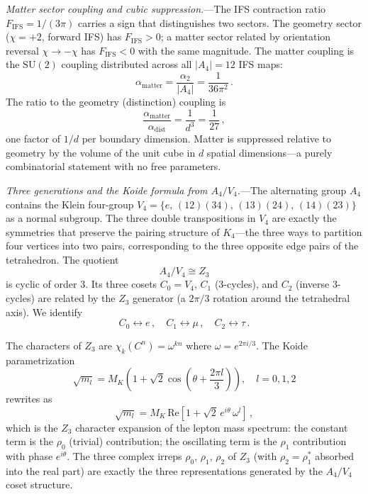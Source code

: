\documentclass[aip,graphicx]{revtex4-1}
\begin{document}
\textit{Matter sector coupling and cubic suppression.}---The
IFS contraction ratio $F_{\mathrm{IFS}} = 1/(3\pi)$ carries a sign
that distinguishes two sectors. The geometry sector ($\chi = +2$,
forward IFS) has $F_{\mathrm{IFS}} > 0$; a matter sector related by
orientation reversal $\chi \to -\chi$ has $F_{\mathrm{IFS}} < 0$
with the same magnitude. The matter coupling is the $\mathrm{SU}(2)$
coupling distributed across all $|A_4| = 12$ IFS maps:
\begin{equation}
\alpha_{\mathrm{matter}} = \frac{\alpha_2}{|A_4|} = \frac{1}{36\pi^2}\,.
\label{eq:amatter}
\end{equation}
The ratio to the geometry (distinction) coupling is
\begin{equation}
\frac{\alpha_{\mathrm{matter}}}{\alpha_{\mathrm{dist}}} =
\frac{1}{d^3} = \frac{1}{27}\,,
\label{eq:suppression}
\end{equation}
one factor of $1/d$ per boundary dimension. Matter is suppressed
relative to geometry by the volume of the unit cube in $d$ spatial
dimensions---a purely combinatorial statement with no free parameters.

\textit{Three generations and the Koide formula from $A_4/V_4$.}---The
alternating group $A_4$ contains the Klein four-group
$V_4 = \{e,\,(12)(34),\,(13)(24),\,(14)(23)\}$ as a normal subgroup.
The three double transpositions in $V_4$ are exactly the symmetries
that preserve the pairing structure of $K_4$---the three ways to
partition four vertices into two pairs, corresponding to the three
opposite edge pairs of the tetrahedron. The quotient
\begin{equation}
A_4 / V_4 \cong Z_3
\label{eq:quotient}
\end{equation}
is cyclic of order 3. Its three cosets $C_0 = V_4$, $C_1$
(3-cycles), and $C_2$ (inverse 3-cycles) are related by the $Z_3$
generator (a $2\pi/3$ rotation around the tetrahedral axis). We
identify
\begin{equation}
C_0 \leftrightarrow e\,,\quad C_1 \leftrightarrow \mu\,,\quad
C_2 \leftrightarrow \tau\,.
\label{eq:genid}
\end{equation}

The characters of $Z_3$ are $\chi_k(C^n) = \omega^{kn}$ where
$\omega = e^{2\pi i/3}$. The Koide
parametrization~\cite{koide1983}
\begin{equation}
\sqrt{m_l} = M_K\!\left(1 + \sqrt{2}\cos\!\left(\theta +
\frac{2\pi l}{3}\right)\right), \quad l = 0, 1, 2
\label{eq:koide_param}
\end{equation}
rewrites as
\begin{equation}
\sqrt{m_l} = M_K\,\mathrm{Re}\!\left[1 + \sqrt{2}\,
e^{i\theta}\,\omega^l\right]\,,
\label{eq:koide_z3}
\end{equation}
which is the $Z_3$ character expansion of the lepton mass spectrum:
the constant term is the $\rho_0$ (trivial) contribution; the
oscillating term is the $\rho_1$ contribution with phase $e^{i\theta}$.
The three complex irreps $\rho_0$, $\rho_1$, $\rho_2$ of $Z_3$
(with $\rho_2 = \rho_1^*$ absorbed into the real part) are exactly
the three representations generated by the $A_4/V_4$ coset structure.
\end{document}
